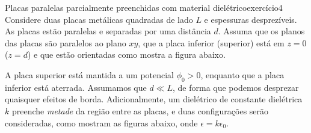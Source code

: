 \begin{exercício}{Placas paralelas parcialmente preenchidas com material dielétrico}{exercício4}
    Considere duas placas metálicas quadradas de lado \(L\) e espessuras desprezíveis. As placas estão paralelas e separadas por uma distância \(d\). Assuma que os planos das placas são paralelos ao plano \(xy\), que a placa inferior (superior) está em \(z = 0\) (\(z = d\)) e que estão orientadas como mostra a figura abaixo.

    \begin{center}
    \end{center}
    A placa superior está mantida a um potencial \(\phi_0>0\), enquanto que a placa inferior está aterrada. Assumamos que \(d \ll L\), de forma que podemos desprezar quaisquer efeitos de borda. Adicionalmente, um dielétrico de constante dielétrica \(k\) preenche \emph{metade} da região entre as placas, e duas configurações serão consideradas, como mostram as figuras abaixo, onde \(\epsilon = k \epsilon_0\).

    \begin{center}
\end{center}
\end{exercício}
